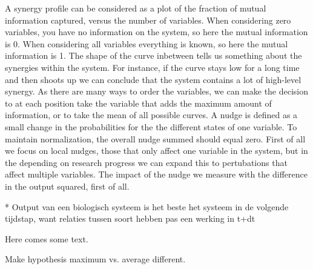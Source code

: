 \documentclass[../main.tex]{subfiles}
\begin{document}
A synergy profile can be considered as a plot of the fraction of mutual information captured, versus the number of variables. 
When considering zero variables, you have no information on the system, so here the mutual information is 0.
When considering all variables everything is known, so here the mutual information is
1. 
The shape of the curve inbetween tells us something about the synergies within the system.
For instance, if the curve stays low for a long time and then shoots up we can conclude that the system contains a lot of high-level synergy. As there are many ways to order the variables, we can make the decision to at each position take the variable that adds the maximum amount of information, or to take the mean of all possible curves.
A nudge is defined as a small change in the probabilities for the the different states of one variable. To maintain normalization, the overall nudge summed should equal zero.
First of all we focus on local nudges, those that only affect one variable in the system, but in the depending on research progress we can expand this to pertubations that affect multiple variables. 
The impact of the nudge we measure with the difference in the output squared, first of all.

* Output van een biologisch systeem is het beste het systeem in de volgende tijdstap, want relaties tussen soort hebben pas een werking in t+dt

Here comes some text.

Make hypothesis maximum vs. average different.
\end{document}

